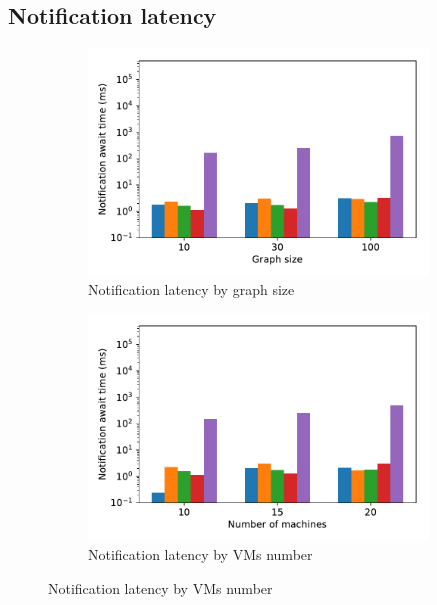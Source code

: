 \subsection{Notification latency}
\begin{figure}[t!]
    \begin{subfigure}[b]{0.32\textwidth}
            \includegraphics[width=0.99\textwidth]{pics/notification_await_time_by_graph_size_bars.pdf}
            \caption{Notification latency by graph size}
            \label{notification_graph}
    \end{subfigure}
    \hspace{5mm}
    \begin{subfigure}[b]{0.32\textwidth}
            \includegraphics[width=0.99\textwidth]{pics/notification_await_time_by_number_of_machines_bars.pdf}
            \caption{Notification latency by VMs number}

\end{subfigure}
\end{figure}
